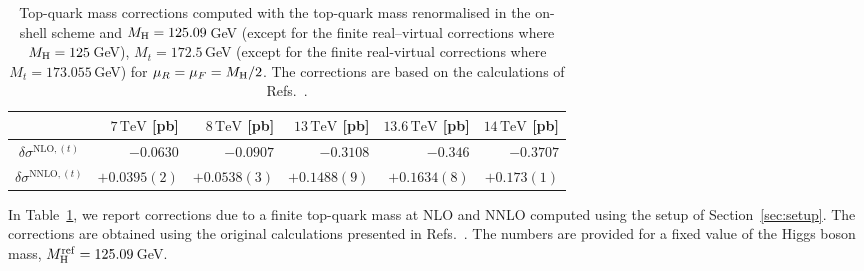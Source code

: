 \begin{table}[h!]
\centering
\begin{tabular}{|c|r|r|r|r|r|}
\hline
& $7\,\mathrm{TeV}$ [pb] & $8\,\mathrm{TeV}$ [pb] & $13\,\mathrm{TeV}$ [pb] & $13.6\,\mathrm{TeV}$ [pb] & $14\,\mathrm{TeV}$ [pb] \\ \hline
$\delta \sigma^{\mathrm{NLO}, (t)}$  & $-0.0630$           & $-0.0907$           & $-0.3108$            & $-0.346$               & $-0.3707$            \\
$\delta \sigma^{\mathrm{NNLO}, (t)}$ & $+0.0395(2)$        & $+0.0538(3)$        & $+0.1488(9)$         & $+0.1634(8)$           & $+0.173(1)$          \\ \hline
\end{tabular}
\caption{
Top-quark mass corrections computed with the top-quark mass renormalised in the on-shell scheme and $M_\mathrm{H}=125.09$\,GeV (except for the finite real--virtual corrections where $M_\mathrm{H}=125$\,GeV), $M_t=172.5$\,GeV (except for the finite real-virtual corrections where $M_t = 173.055$\,GeV) for $\mu_R = \mu_F = M_\mathrm{H}/2$.
The corrections are based on the calculations of Refs.~\cite{Czakon:2020vql,Czakon:2021yub,Czakon:2024ywb}.
}
\label{tab:ggf_mtcorr}
\end{table}

In Table~\ref{tab:ggf_mtcorr}, we report corrections due to a finite top-quark mass at NLO and NNLO computed using the setup of Section~\ref{sec:setup}.
The corrections are obtained using the original calculations presented in Refs.~\cite{Czakon:2020vql,Czakon:2021yub,Czakon:2024ywb}.
The numbers are provided for a fixed value of the Higgs boson mass, $M_\mathrm{H}^\mathrm{ref}=125.09$\,GeV.

